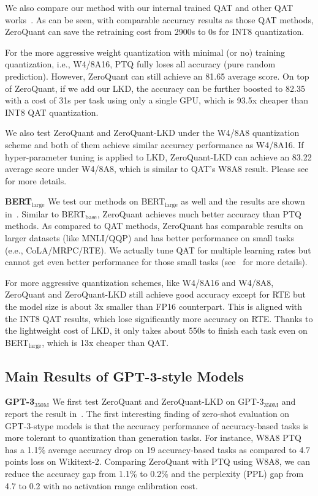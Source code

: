 We also compare our method with our internal trained QAT and other QAT works~\cite{shen2020q,zafrir2019q8bert}. As can be seen, with comparable accuracy results as those QAT methods, ZeroQuant can save the retraining cost from 2900s to 0s for INT8 quantization.  

For the more aggressive weight quantization with minimal (or no) training quantization, i.e., W4/8A16, PTQ fully loses all accuracy (pure random prediction). However, ZeroQuant can still achieve an 81.65 average score. On top of ZeroQuant, if we add our LKD, the accuracy can be further boosted to 82.35 with a cost of 31s per task using only a single GPU, which is 93.5x cheaper than INT8 QAT quantization.

We also test ZeroQuant and ZeroQuant-LKD under the W4/8A8 quantization scheme and both of them achieve similar accuracy performance as W4/8A16. If hyper-parameter tuning is applied to LKD, ZeroQuant-LKD can achieve an 83.22 average score under W4/8A8, which is similar to QAT's W8A8 result. Please see~ for more details.

\textbf{BERT$_{\text{large}}$}
We test our methods on BERT$_{\text{large}}$ as well and the results are shown in~. 
Similar to BERT$_\text{base}$, ZeroQuant achieves much better accuracy than PTQ methods. As compared to QAT methods, ZeroQuant has comparable results on larger datasets (like MNLI/QQP) and has better performance on small tasks (e.e., CoLA/MRPC/RTE). We actually tune QAT for multiple learning rates but cannot get even better performance for those small tasks (see~ for more details). 

For more aggressive quantization schemes, like W4/8A16 and W4/8A8, ZeroQuant and ZeroQuant-LKD still achieve good accuracy except for RTE but the model size is about 3x smaller than FP16 counterpart. This is aligned with the INT8 QAT results, which lose significantly more accuracy on RTE. Thanks to the lightweight cost of LKD, it only takes about 550s to finish each task even on BERT$_{\text{large}}$, which is 13x cheaper than QAT. 

\subsection{Main Results of GPT-3-style Models}

\textbf{GPT-3$_{\text{350M}}$}
We first test ZeroQuant and ZeroQuant-LKD on GPT-3$_{\text{350M}}$ and report the result in~. 
The first interesting finding of zero-shot evaluation on GPT-3-stype models is that the accuracy performance of accuracy-based tasks is more tolerant to quantization than generation tasks. For instance, W8A8 PTQ has a 1.1\% average accuracy drop on 19 accuracy-based tasks as compared to 4.7 points loss on Wikitext-2. Comparing ZeroQuant with PTQ using W8A8, we can reduce the accuracy gap from 1.1\% to 0.2\% and the perplexity (PPL) gap from 4.7 to 0.2 with no activation range calibration cost. 

